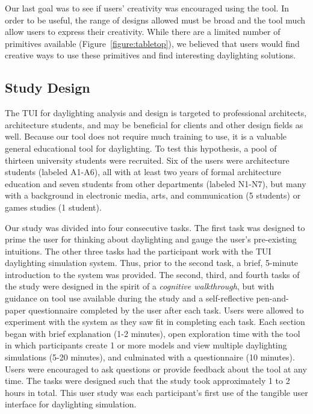\documentclass[preprint]{elsarticle}
\begin{document}
Our last goal was to see if users' creativity was encouraged using the
tool.  In order to be useful, the range of designs allowed must be broad and the
tool much allow users to express their creativity.  While there are a
limited number of primitives available (Figure~\ref{figure:tabletop}), we
believed that users would find creative ways to use these primitives
and find interesting daylighting solutions.

\subsection{Study Design}

The TUI for daylighting analysis and design is targeted to
professional architects, architecture students, and may be beneficial
for clients and other design fields as well.  Because our tool does
not require much training to use, it is a valuable general
educational tool for daylighting.  To test this hypothesis, a pool of thirteen university
students were recruited. Six of the users were architecture students (labeled
A1-A6), all with at least two years of formal architecture education
and seven students from other departments (labeled N1-N7), but many
with a background in electronic media, arts, and communication (5
students) or games studies (1 student).

Our study was divided into four consecutive tasks.  The first task was
designed to prime the user for thinking about daylighting and gauge
the user's pre-existing intuitions.  The other three tasks had the
participant work with the TUI daylighting simulation system.  Thus,
prior to the second task, a brief, 5-minute introduction to the system
was provided.  The second, third, and fourth tasks of the study were
designed in the spirit of a \emph{cognitive walkthrough}, but with
guidance on tool use available during the study and a self-reflective
pen-and-paper questionnaire completed by the user after each task.
Users were allowed to experiment with the system as they saw fit in
completing each task.
%
Each section began with brief explanation (1-2 minutes), open
exploration time with the tool in which participants create 1 or more
models and view multiple daylighting simulations (5-20 minutes), and
culminated with a questionnaire (10 minutes).  Users were encouraged
to ask questions or provide feedback about the tool at any time.  The
tasks were designed such that the study took approximately 1 to 2
hours in total.  This user study was each participant's first use
of the tangible user interface for daylighting simulation.
\end{document}
